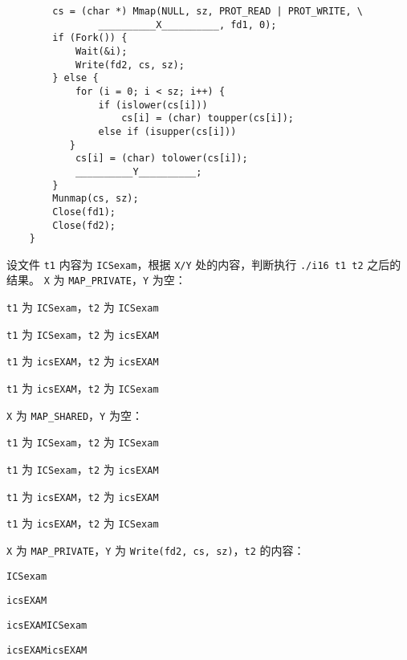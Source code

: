 \begin{problems}
\begin{verbatim}
        cs = (char *) Mmap(NULL, sz, PROT_READ | PROT_WRITE, \
                __________X__________, fd1, 0);
        if (Fork()) {
            Wait(&i);
            Write(fd2, cs, sz);
        } else {
            for (i = 0; i < sz; i++) {
                if (islower(cs[i]))
                    cs[i] = (char) toupper(cs[i]);
                else if (isupper(cs[i]))
           }
            cs[i] = (char) tolower(cs[i]);
            __________Y__________;
        }
        Munmap(cs, sz);
        Close(fd1);
        Close(fd2);
    }
        \end{verbatim}
        \qn 设文件 \verb|t1| 内容为 \verb|ICSexam|，根据 \verb|X/Y| 处的内容，判断执行 \verb|./i16 t1 t2| 之后的结果。
            \subqn \verb|X| 为 \verb|MAP_PRIVATE|，\verb|Y| 为空：
            \begin{choices}
                \item \verb|t1| 为 \verb|ICSexam|，\verb|t2| 为 \verb|ICSexam|
                \item \verb|t1| 为 \verb|ICSexam|，\verb|t2| 为 \verb|icsEXAM|
                \item \verb|t1| 为 \verb|icsEXAM|，\verb|t2| 为 \verb|icsEXAM|
                \item \verb|t1| 为 \verb|icsEXAM|，\verb|t2| 为 \verb|ICSexam|
            \end{choices}
            \subqn \verb|X| 为 \verb|MAP_SHARED|，\verb|Y| 为空：
            \begin{choices}
                \item \verb|t1| 为 \verb|ICSexam|，\verb|t2| 为 \verb|ICSexam|
                \item \verb|t1| 为 \verb|ICSexam|，\verb|t2| 为 \verb|icsEXAM|
                \item \verb|t1| 为 \verb|icsEXAM|，\verb|t2| 为 \verb|icsEXAM|
                \item \verb|t1| 为 \verb|icsEXAM|，\verb|t2| 为 \verb|ICSexam|
            \end{choices}
            \subqn \verb|X| 为 \verb|MAP_PRIVATE|，\verb|Y| 为 \verb|Write(fd2, cs, sz)|，\verb|t2| 的内容：
            \begin{choices}
                \item \verb|ICSexam|
                \item \verb|icsEXAM|
                \item \verb|icsEXAMICSexam|
                \item \verb|icsEXAMicsEXAM|
            \end{choices}

\end{problems}
